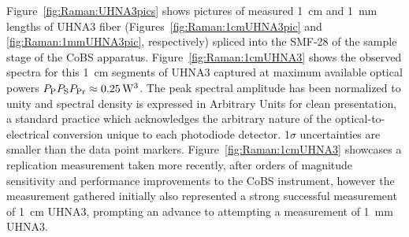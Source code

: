 Figure~\ref{fig:Raman:UHNA3pics} shows pictures of measured \SI{1}{\centi\meter} and \SI{1}{\milli\meter} lengths of \ac{UHNA3} fiber (Figures~\ref{fig:Raman:1cmUHNA3pic} and \ref{fig:Raman:1mmUHNA3pic}, respectively) spliced into the \ac{SMF-28} of the sample stage of the \ac{CoBS} apparatus. Figure~\ref{fig:Raman:1cmUHNA3} shows the observed spectra for this \SI{1}{\centi\meter} segments of \ac{UHNA3} captured at maximum available optical powers \(P_{\rm P}P_{\rm S}P_{\rm Pr} \approx \SI{0.25}{\cubic\watt}\). The peak spectral amplitude has been normalized to unity and spectral density is expressed in Arbitrary Units for clean presentation, a standard practice which acknowledges the arbitrary nature of the optical-to-electrical conversion unique to each photodiode detector. 1\(\sigma\) uncertainties are smaller than the data point markers. Figure~\ref{fig:Raman:1cmUHNA3} showcases a replication measurement taken more recently, after orders of magnitude sensitivity and performance improvements to the \ac{CoBS} instrument, however the measurement gathered initially also represented a strong successful measurement of \SI{1}{\centi\meter} \ac{UHNA3}, prompting an advance to attempting a measurement of \SI{1}{\milli\meter} \ac{UHNA3}.

